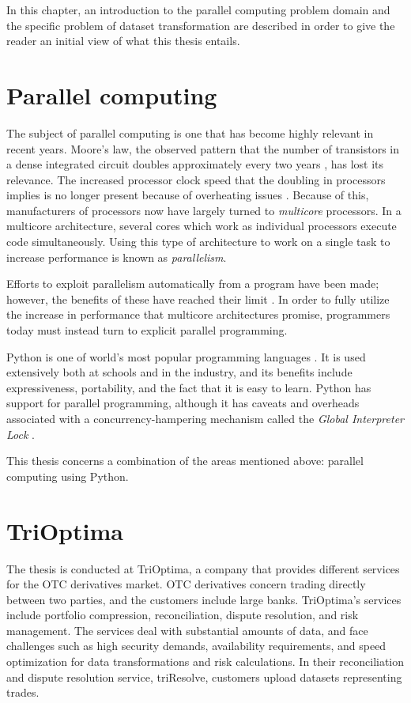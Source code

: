 In this chapter, an introduction to the parallel computing problem domain and the specific problem of dataset transformation are
described in order to give the reader an initial view of what this thesis entails.

\section{Parallel computing}
The subject of parallel computing is one that has become highly relevant in recent years.
Moore's law, the observed pattern that the number of transistors in a dense integrated circuit doubles approximately every two
years \cite{moore_1998_cramming_cmcoic},
has lost its relevance. The increased processor clock speed that the doubling in processors implies is no longer present because of
overheating issues \cite[p. 1]{herlihy_2012_art_taomprr}. Because of this, manufacturers of processors now have
largely turned to \emph{multicore} processors. In a multicore architecture, several cores which work as individual processors execute
code simultaneously. Using this type of architecture to work on a single task to increase performance is known as \emph{parallelism}.

Efforts to exploit parallelism automatically from a program have been made; however, the benefits of these have reached their
limit \cite[p. 7-12]{mccool_2012_structured_spppfec}. In order to fully utilize the increase in performance that multicore
architectures promise, programmers today must instead turn to explicit parallel programming.

Python is one of world's most popular programming languages \cite{krill_2015_python_psnhilp}. It is used extensively both at schools and
in the industry, and its benefits include expressiveness, portability, and the fact that it is easy to learn. Python has support for
parallel programming, although it has caveats and overheads associated with a concurrency-hampering mechanism called the
\emph{Global Interpreter Lock} \cite{beazley_150745UTC_introduction_aitpc}.

This thesis concerns a combination of the areas mentioned above: parallel computing using Python.

\section{TriOptima} \label{trioptima}
The thesis is conducted at TriOptima, a company that provides different services for the OTC derivatives market.
OTC derivatives concern trading directly between two parties, and the customers include large banks. TriOptima’s services
include portfolio compression, reconciliation, dispute resolution, and risk management. The services deal with substantial
amounts of data, and face challenges such as high security demands, availability requirements, and speed optimization
for data transformations and risk calculations. In their reconciliation and dispute resolution service,
triResolve, customers upload datasets representing trades. 

